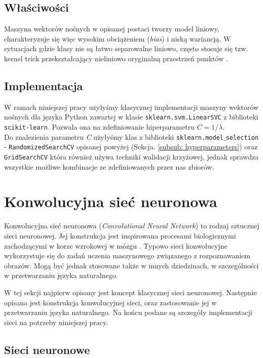 \subsection{Właściwości}

Maszyna wektorów nośnych w opisanej postaci tworzy model liniowy, charakteryzuje się więc wysokim obciążeniem (\textit{bias}) i niską wariancją. W sytuacjach gdzie klasy nie są łatwo separowalne liniowo, często stosuje się tzw. kernel trick przekształcający nieliniowo oryginalną przestrzeń punktów \cite{aizerman1964theoretical}.

\subsection{Implementacja}

W ramach niniejszej pracy użyłyśmy klasycznej implementacji maszyny wektorów nośnych dla języka Python zawartej w klasie \verb_sklearn.svm.LinearSVC_ z biblioteki \verb_scikit-learn_. Pozwala ona na zdefiniowanie hiperparametru $C = 1/ \lambda$.
\\Do znalezienia parametru \textit{C} użyłyśmy klas z biblioteki \verb_sklearn.model_$\_$\verb_selection_ - \verb_RandomizedSearchCV_ opisanej powyżej (Sekcja. \ref{subsub: hyperparameters}) oraz \verb_GridSearchCV_  
która również używa techniki walidacji krzyżowej, jednak sprawdza wszystkie możliwe kombinacje ze zdefiniowanych przez nas zbiorów. 


\section{Konwolucyjna sieć neuronowa}
\label{sec:cnn}
Konwolucyjna sieć neuronowa (\textit{Convolutional Neural Network}) to rodzaj sztucznej sieci neuronowej. Jej konstrukcja jest inspirowana procesami biologicznymi zachodzącymi w korze wzrokowej w mózgu \cite{chauhan2018convolutional}. Typowo sieci konwolucyjne wykorzystuje się do zadań uczenia maszynowego związanego z rozpoznawaniem obrazów. Mogą być jednak stosowane także w innych dziedzinach, w szczególności w przetwarzaniu języka naturalnego.

W tej sekcji najpierw opisany jest koncept klasycznej sieci neuronowej. Następnie opisana jest konstrukcja konwolucyjnej sieci, oraz zastosowanie jej w przetwarzaniu języka naturalnego. Na końcu podane są szczegóły implementacji sieci na potrzeby niniejszej pracy.

\subsection{Sieci neuronowe}
\label{subsec:nn}

